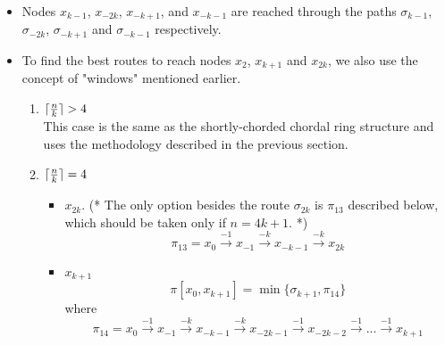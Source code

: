 \begin{itemize}

  \item  Nodes $x_{k-1}$, $x_{-2k}$, $x_{-k+1}$, and $x_{-k-1}$ are reached through the paths $\sigma_{k-1}$, $\sigma_{-2k}$, $\sigma_{-k+1}$ and $\sigma_{-k-1}$ respectively.
 



\item To find the best routes to reach nodes $x_2$, $x_{k+1}$ and $x_{2k}$, we also use the concept of "windows"  mentioned earlier.
\begin{enumerate}


\item  $\lceil {n \over k} \rceil >  4$ \\
This case is the same as the shortly-chorded chordal ring structure and uses the methodology described in the previous section.

\item  $\lceil {n \over k} \rceil=  4$ 
 
      
  \begin{itemize}    
\item $x_{2k}$.  (* The only option   besides the route $ \sigma_{2k}$ is  $\pi_{13}$ described below, which should be taken only   if $n=4k+1$. *)
 $$\pi_{13} = x_{0} \xrightarrow {-1} x_{-1} \xrightarrow {-k} x_{-k-1} \xrightarrow {-k} x_{2k}$$
 

 \item $x_{k+1}$ 
  $$ \pi[x_0,x_{k+1}] = \min \{   \sigma_{k+1}, \pi_{14}\}$$
  where
$$\pi_{14} = x_{0} \xrightarrow {-1} x_{-1} \xrightarrow {-k} x_{-k-1} \xrightarrow {-k} x_{-2k-1} \xrightarrow {-1} x_{-2k-2}\xrightarrow {-1} ... \xrightarrow {-1} x_{k+1}$$

 







\end{itemize}
\end{enumerate}
\end{itemize}
